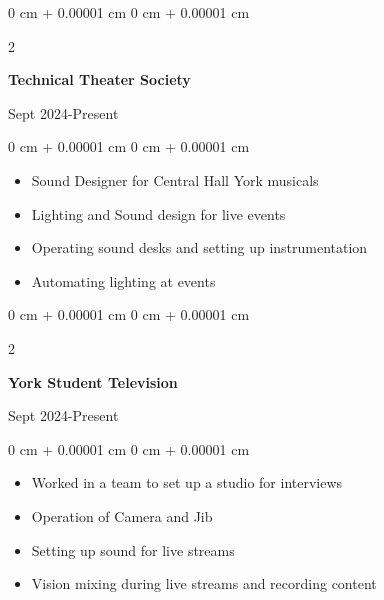 \documentclass[10pt, letterpaper]{article}
\newenvironment{onecolentry}{
    \begin{adjustwidth}{
        0 cm + 0.00001 cm
    }{
        0 cm + 0.00001 cm
    }
}{
    \end{adjustwidth}
} %
\newenvironment{twocolentry}[2][]{
    \onecolentry
    \def\secondColumn{#2}
    \setcolumnwidth{\fill, 4.5 cm}
    \begin{paracol}{2}
}{
    \switchcolumn \raggedleft \secondColumn
    \end{paracol}
    \endonecolentry
} %
\begin{document}
\begin{samepage}
         \begin{twocolentry}{
              Sept 2024-Present
            }
                \textbf{Technical Theater Society}

                \vspace{0.10 cm}
            \end{twocolentry}


            \vspace{0.10 cm}

            \begin{onecolentry}
                \begin{itemize}
                    \item Sound Designer for Central Hall York musicals
                    \item Lighting and Sound design for live events
                    \item Operating sound desks and setting up instrumentation
                    \item Automating lighting at events 
                \end{itemize}
            \end{onecolentry}

        \vspace{0.10 cm}


    \begin{twocolentry}{
              Sept 2024-Present
            }
                \textbf{York Student Television}

                \vspace{0.10 cm}
            \end{twocolentry}


            \vspace{0.10 cm}

            \begin{onecolentry}
                \begin{itemize}
                    \item Worked in a team to set up a studio for interviews
                    \item Operation of Camera and Jib
                    \item Setting up sound for live streams
                    \item Vision mixing during live streams and recording content
                \end{itemize}
            \end{onecolentry}


\end{samepage}
\end{document}
